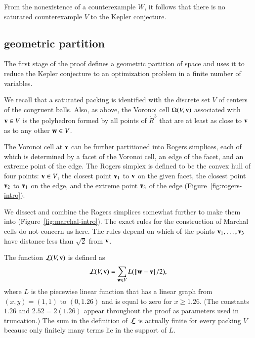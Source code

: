 From the nonexistence of a counterexample $W$, 
it follows that there is no saturated
counterexample $V$ to the Kepler conjecture.



\subsection{geometric partition}

The first stage of the proof defines a geometric partition of space
and uses it to reduce the Kepler conjecture to an optimization problem
in a finite number of variables.

We recall that a saturated packing is
identified with the discrete set $V$ of centers of the
congruent balls.  Also, as above, the Voronoi cell $\Omega(V,{\mathbf v})$
associated with ${\mathbf v}\in V$ is the polyhedron formed by all points of
$\ring{R}^3$ that are at least as close to ${\mathbf v}$ as to any other ${\mathbf w}\in
V$.   

The Voronoi cell at ${\mathbf v}$ can be further partitioned into Rogers
simplices, each of which is determined by a facet of the Voronoi cell, an edge of
the facet, and an extreme point of the edge.  The Rogers simplex is defined to be the
convex hull of four points: ${\mathbf v}\in V$, the closest point ${\mathbf v}_1$ to ${\mathbf v}$ on the given facet, the closest point ${\mathbf v}_2$ to ${\mathbf v}_1$ on the edge, and the
extreme point ${\mathbf v}_3$ of the edge (Figure~\ref{fig:rogers-intro}).

\figORQISJR %

We dissect and combine the Rogers simplices somewhat further to make
them into  (Figure~\ref{fig:marchal-intro}).  
The exact rules for the
construction of Marchal cells do not concern us here.  The rules
depend on which of the points ${\mathbf v}_1,\ldots,{\mathbf v}_3$ have distance less
than $\sqrt2$ from ${\mathbf v}$.
%

\figODGBUWK %

The function
 ${\mathcal L}(V,{\mathbf v})$ is defined as
\begin{equation}\label{eqn:LV0}
\CalL(V,\v) = \sum_{\w\in V} L(\norm{\w}{\v}/2),
\end{equation}
where $L$ is the piecewise linear function that has a linear graph from
$(x,y)=(1,1)$ to $(0,1.26)$ and is equal to zero for $x\ge 1.26$.  (The
constants $1.26$ and $2.52=2(1.26)$ appear throughout the proof as
parameters used in truncation.)   
The sum in the definition of ${\mathcal L}$ is actually finite for every packing $V$ because only finitely many terms
lie in the support of $L$. 

